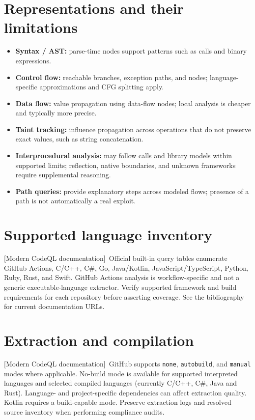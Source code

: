 \documentclass[11pt,letterpaper,oneside]{book}
\newcommand{\srcM}{\textsf{[Modern CodeQL documentation]}}
\begin{document}
\section{Representations and their limitations}

\begin{itemize}
\item \textbf{Syntax / AST:} parse-time nodes support patterns such as calls and binary expressions.
\item \textbf{Control flow:} reachable branches, exception paths, and nodes; language-specific approximations and CFG splitting apply.
\item \textbf{Data flow:} value propagation using data-flow nodes; local analysis is cheaper and typically more precise.
\item \textbf{Taint tracking:} influence propagation across operations that do not preserve exact values, such as string concatenation.
\item \textbf{Interprocedural analysis:} may follow calls and library models within supported limits; reflection, native boundaries, and unknown frameworks require supplemental reasoning.
\item \textbf{Path queries:} provide explanatory steps across modeled flows; presence of a path is not automatically a real exploit.
\end{itemize}

\section{Supported language inventory}

\srcM\ Official built-in query tables enumerate GitHub Actions, C/C++, C\#, Go, Java/Kotlin, JavaScript/TypeScript, Python, Ruby, Rust, and Swift. GitHub Actions analysis is workflow-specific and not a generic executable-language extractor. Verify supported framework and build requirements for each repository before asserting coverage. See the bibliography for current documentation URLs.

\section{Extraction and compilation}

\srcM\ GitHub supports \texttt{none}, \texttt{autobuild}, and \texttt{manual} modes where applicable. No-build mode is available for supported interpreted languages and selected compiled languages (currently C/C++, C\#, Java and Rust). Language- and project-specific dependencies can affect extraction quality. Kotlin requires a build-capable mode. Preserve extraction logs and resolved source inventory when performing compliance audits.
\end{document}
